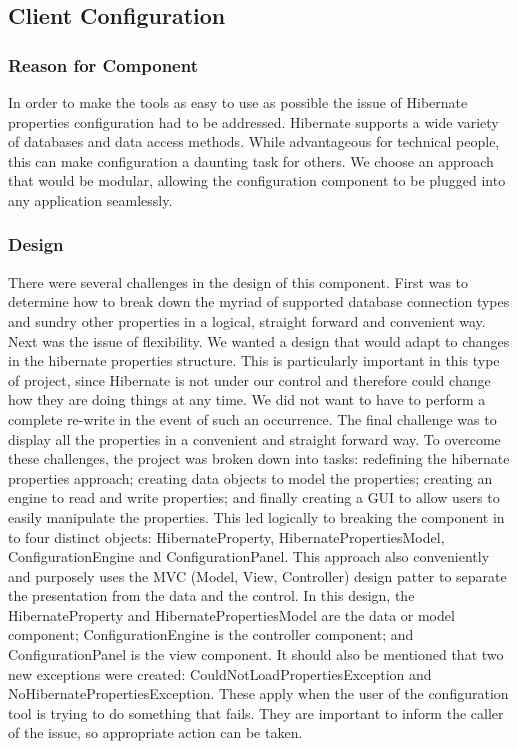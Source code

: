 \subsection{Client Configuration}

\subsubsection{Reason for Component}
In order to make the tools as easy to use as possible the issue of Hibernate properties configuration had to be addressed. Hibernate supports a wide variety of databases and data access methods. While advantageous for technical people, this can make configuration a daunting task for others. We choose an approach that would be modular, allowing the configuration component to be plugged into any application seamlessly.  

\subsubsection{Design}
There were several challenges in the design of this component. First was to determine how to break down the myriad of supported database connection types and sundry other properties in a logical, straight forward and convenient way. Next was the issue of flexibility. We wanted a design that would adapt to changes in the hibernate properties structure. This is particularly important in this type of project, since Hibernate is not under our control and therefore could change how they are doing things at any time. We did not want to have to perform a complete re-write in the event of such an occurrence. The final challenge was to display all the properties in a convenient and straight forward way. To overcome these challenges, the project was broken down into tasks: redefining the hibernate properties approach; creating data objects to model the properties; creating an engine to read and write properties; and finally creating a GUI to allow users to easily manipulate the properties. This led logically to breaking the component in to four distinct objects: HibernateProperty, HibernatePropertiesModel, ConfigurationEngine and ConfigurationPanel. This approach also conveniently and purposely uses the MVC (Model, View, Controller) design patter to separate the presentation from the data and the control. In this design, the HibernateProperty and HibernatePropertiesModel are the data or model component; ConfigurationEngine is the controller component; and ConfigurationPanel is the view component. It should also be mentioned that two new exceptions were created: CouldNotLoadPropertiesException and NoHibernatePropertiesException. These apply when the user of the configuration tool is trying to do something that fails. They are important to inform the caller of the issue, so appropriate action can be taken.

